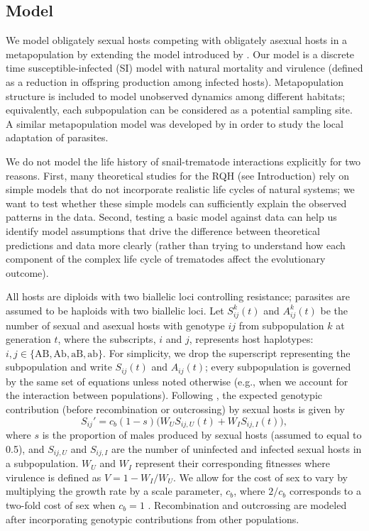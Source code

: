 \documentclass{article}\usepackage[]{graphicx}\usepackage[]{color}
\begin{document}
\subsection{Model}

We model obligately sexual hosts competing with obligately asexual hosts in a metapopulation by extending the model introduced by \cite{lively2010epidemiological}.
Our model is a discrete time susceptible-infected (SI) model with natural mortality and virulence (defined as a reduction in offspring production among infected hosts).
Metapopulation structure is included to model unobserved dynamics among different habitats; equivalently, each subpopulation can be considered as a potential sampling site.
A similar metapopulation model was developed by \cite{lively2018habitat} in order to study the local adaptation of parasites.

We do not model the life history of snail-trematode interactions explicitly for 
two reasons.
First, many theoretical studies for the RQH (see Introduction) rely on simple models 
that do not incorporate realistic life cycles of natural systems; we want to test
whether these simple models can sufficiently explain the observed patterns in the data.
Second, testing a basic model against data can help us identify model assumptions
that drive the difference between theoretical predictions and data more clearly (rather
than trying to understand how each component of the complex life cycle of trematodes 
affect the evolutionary outcome).

All hosts are diploids with two biallelic loci controlling resistance; parasites are assumed to be haploids with two biallelic loci.
Let $S_{ij}^k(t)$ and $A_{ij}^k(t)$ be the number of sexual and asexual hosts with genotype $ij$ from subpopulation $k$ at generation $t$, 
where the subscripts, $i$ and $j$, represents host haplotypes: $i, j \in \{\mathrm{AB}, \mathrm{Ab}, \mathrm{aB}, \mathrm{ab}\}$.
For simplicity, we drop the superscript representing the subpopulation and write $S_{ij}(t)$ and $A_{ij}(t)$;
every subpopulation is governed by the same set of equations unless noted otherwise (e.g., when we account for the interaction between populations).
Following \cite{lively2010epidemiological}, the expected genotypic contribution (before recombination or outcrossing) by sexual hosts is given by
\begin{equation}
S_{ij}' = c_b (1-s) \bigg(W_U S_{ij,U} (t) + W_I S_{ij,I} (t)\bigg),
\end{equation}
where $s$ is the proportion of males produced by sexual hosts (assumed to equal to 0.5), and $S_{ij, U}$ and $S_{ij,I}$ are the number of uninfected and infected sexual hosts in a subpopulation.
$W_U$ and $W_I$ represent their corresponding fitnesses where virulence is defined as $V = 1-W_I/W_U$.
We allow for the cost of sex to vary by multiplying the growth rate by a scale parameter, $c_b$, where $2/c_b$ corresponds to a two-fold cost of sex when $c_b = 1$ \citep{ashby2015diversity}.
Recombination and outcrossing are modeled after incorporating genotypic contributions from other populations.
\end{document}

